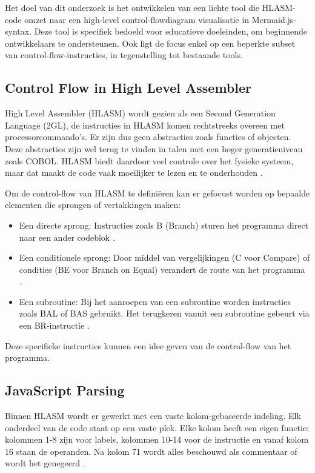 Het doel van dit onderzoek is het ontwikkelen van een lichte tool die HLASM-code omzet naar een high-level control-flowdiagram visualisatie in Mermaid.js-syntax. Deze tool is specifiek bedoeld voor educatieve doeleinden, om beginnende ontwikkelaars te ondersteunen. Ook ligt de focus enkel op een beperkte subset van control-flow-instructies, in tegenstelling tot bestaande tools.


\subsection{Control Flow in High Level Assembler}

High Level Assembler (HLASM) wordt gezien als een Second Generation Language (2GL), de instructies in HLASM komen rechtstreeks overeen met processorcommando's. Er zijn dus geen abstracties zoals functies of objecten. Deze abstracties zijn wel terug te vinden in talen met een hoger generatieniveau zoals COBOL. HLASM biedt daardoor veel controle over het fysieke systeem, maar dat maakt de code vaak moeilijker te lezen en te onderhouden \autocite{kornelis_2003}.
 
Om de control-flow van HLASM te definiëren kan er gefocust worden op bepaalde elementen die sprongen of vertakkingen maken: 

\begin{itemize}
    \item Een directe sprong: Instructies zoals B (Branch) sturen het programma direct naar een ander codeblok \autocite{ibm_hlasm_programmers_guide}.
    \item Een conditionele sprong: Door middel van vergelijkingen (C voor Compare) of condities (BE voor Branch on Equal) verandert de route van het programma \autocite{ibm_hlasm_programmers_guide}. 
    \item Een subroutine: Bij het aanroepen van een subroutine worden instructies zoals BAL of BAS gebruikt. Het terugkeren vanuit een subroutine gebeurt via een BR-instructie \autocite{ward_2013}.
\end{itemize}

Deze specifieke instructies kunnen een idee geven van de control-flow van het programma. 


\subsection{JavaScript Parsing}
Binnen HLASM wordt er gewerkt met een vaste kolom-gebaseerde indeling. Elk onderdeel van de code staat op een vaste plek. Elke kolom heeft een eigen functie: kolommen 1-8 zijn voor labels, kolommen 10-14 voor de instructie en vanaf kolom 16 staan de operanden. Na kolom 71 wordt alles beschouwd als commentaar of wordt het genegeerd \autocite{ibm_hlasm}. 

